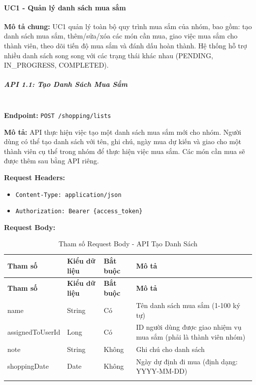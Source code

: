 \paragraph{UC1 - Quản lý danh sách mua sắm}

\textbf{Mô tả chung:} UC1 quản lý toàn bộ quy trình mua sắm của nhóm, bao gồm: tạo danh sách mua sắm, thêm/sửa/xóa các món cần mua, giao việc mua sắm cho thành viên, theo dõi tiến độ mua sắm và đánh dấu hoàn thành. Hệ thống hỗ trợ nhiều danh sách song song với các trạng thái khác nhau (PENDING, IN\_PROGRESS, COMPLETED).

\subparagraph{API 1.1: Tạo Danh Sách Mua Sắm}~\\

\textbf{Endpoint:} \texttt{POST /shopping/lists}

\textbf{Mô tả:} API thực hiện việc tạo một danh sách mua sắm mới cho nhóm. Người dùng có thể tạo danh sách với tên, ghi chú, ngày mua dự kiến và giao cho một thành viên cụ thể trong nhóm để thực hiện việc mua sắm. Các món cần mua sẽ được thêm sau bằng API riêng.

\textbf{Request Headers:}
\begin{itemize}
    \item \texttt{Content-Type: application/json}
    \item \texttt{Authorization: Bearer \{access\_token\}}
\end{itemize}

\textbf{Request Body:}

\small
\begin{longtable}{|>{\raggedright\arraybackslash}p{3.5cm}|>{\raggedright\arraybackslash}p{2.5cm}|>{\raggedright\arraybackslash}p{2cm}|>{\raggedright\arraybackslash}p{5.5cm}|}
\hline
\textbf{Tham số} & \textbf{Kiểu dữ liệu} & \textbf{Bắt buộc} & \textbf{Mô tả} \\
\hline
\endfirsthead
\hline
\textbf{Tham số} & \textbf{Kiểu dữ liệu} & \textbf{Bắt buộc} & \textbf{Mô tả} \\
\hline
\endhead
name & String & Có & Tên danh sách mua sắm (1-100 ký tự) \\
\hline
assignedToUserId & Long & Có & ID người dùng được giao nhiệm vụ mua sắm (phải là thành viên nhóm) \\
\hline
note & String & Không & Ghi chú cho danh sách \\
\hline
shoppingDate & Date & Không & Ngày dự định đi mua (định dạng: YYYY-MM-DD) \\
\hline
\caption{Tham số Request Body - API Tạo Danh Sách}
\end{longtable}

